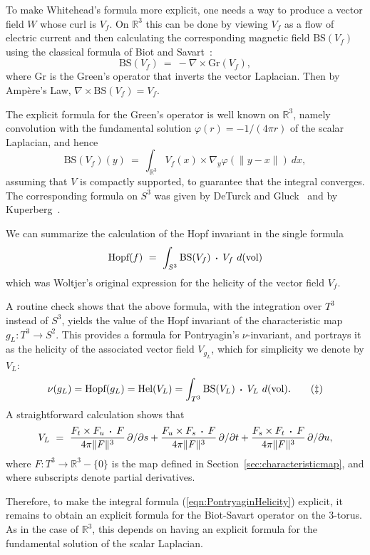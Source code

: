 \documentclass[11pt]{amsart}
\theoremstyle{definition}
\def\br{\mathbb R}
\def\tor{T^3}
\def\dt{\,\raisebox{.2ex}{\text{\tiny\textbullet}}\,}
\def\dtw{\,\dt\,}
\begin{document}
To make Whitehead's formula more explicit, one needs a way to produce a vector field $W$ whose curl is $V_f$.  On $\br^3$ this can be done by viewing $V_f$ as a flow of electric current and then calculating the corresponding magnetic field $\text{BS}(V_f)$ using the classical formula of Biot and Savart~\cite{BiotSavart}:
\[
	\text{BS}(V_f) \ = \ -\nabla \times \text{Gr}(V_f),
\] 
where $\text{Gr}$ is the Green's operator that inverts the vector Laplacian.  Then by Amp\`ere's Law, \mbox{$\nabla \times \text{BS}(V_f) = V_f$}.

The explicit formula for the Green's operator is well known on $\br^3$, namely convolution with the fundamental solution $\varphi(r) = -1/(4\pi r)$ of the scalar Laplacian, and hence
\[
	\text{BS}(V_f)(y) \ = \ \int_{\br^3} V_f(x) \times \nabla_y\varphi\left(\|y-x\|\right)\ dx,
\]
assuming that $V$ is compactly supported, to guarantee that the integral converges.   The corresponding formula on $S^3$ was given by DeTurck and Gluck~\cite{DeTurckGluck} and by Kuperberg~\cite{Kuperberg}.

We can summarize the calculation of the Hopf invariant in the single formula
\[
	\text{Hopf}(f) \ = \ \int_{S^3} \text{BS}(V_f) \dtw V_f \ d(\text{vol})
\]
which was Woltjer's original expression for the helicity of the vector field $V_f$.

A routine check shows that the above formula, with the integration over $T^3$ instead of $S^3$, yields the value of the Hopf invariant of the characteristic map $g_L: \tor \to S^2$.  This provides a formula for Pontryagin's $\nu$-invariant, and portrays it as the helicity of the associated vector field $V_{g_L}$, which for simplicity we denote by $V_L$:
\begin{equation}\label{eqn:PontryaginHelicity}
	\nu(g_L) = \text{Hopf}(g_L) = \text{Hel}(V_L) = \int_{T^3} \text{BS}(V_L) \dtw V_L \ d(\text{vol}).
	\tag{$\ddag$}
\end{equation}
A straightforward calculation shows that
\[
	V_L \ = \ \frac{F_t \times F_u \dtw F}{4\pi \|F\|^3} \, {\partial}/{\partial s} + \frac{F_u \times F_s \dtw F}{4\pi \|F\|^3} \, {\partial}/{\partial t} + \frac{F_s \times F_t \dtw F}{4\pi \|F\|^3} \, {\partial}/{\partial u},
\]
where $F: T^3 \to \br^3 - \{0\}$ is the map defined in Section~\ref{sec:characteristicmap}, and where subscripts denote partial derivatives.

Therefore, to make the integral formula (\ref{eqn:PontryaginHelicity}) explicit, it remains to obtain an explicit formula for the Biot-Savart operator on the 3-torus.  As in the case of $\br^3$, this depends on having an explicit formula for the fundamental solution of the scalar Laplacian.
\end{document}
